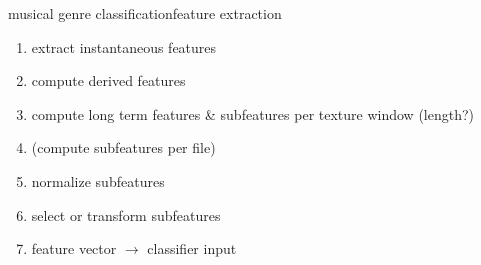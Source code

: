         \begin{frame}{musical genre classification}{feature extraction}
            \begin{enumerate}
                \item	extract instantaneous features
                \smallskip
                \item<2->	compute derived features
                \smallskip
                \item<3->	compute long term features \& subfeatures per texture window (length?)
                \smallskip	
                \item<4->	(compute subfeatures per file)
                \smallskip
                \item<5->   normalize subfeatures
                \smallskip
                \item<6->    select or transform subfeatures
                \smallskip
                \item<7->	feature vector $\rightarrow$ classifier input

\end{enumerate}
\end{frame}
